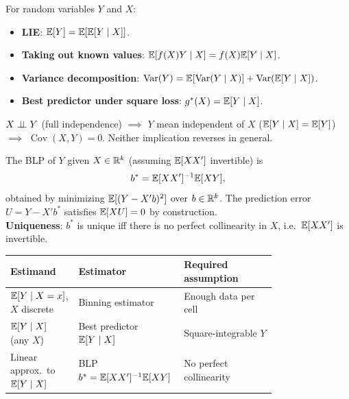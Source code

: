 \begin{remark}
	For random variables $Y$ and $X$:
	\begin{itemize}
		\item \textbf{LIE}: $\mathbb{E}[Y]=\mathbb{E}[\mathbb{E}[Y\mid X]]$.
		\item \textbf{Taking out known values}: $\mathbb{E}[f(X)Y\mid X]=f(X)\mathbb{E}[Y\mid X]$.
		\item \textbf{Variance decomposition}: $\operatorname{Var}(Y)=\mathbb{E}[\operatorname{Var}(Y\mid X)]+\operatorname{Var}(\mathbb{E}[Y\mid X])$.
		\item \textbf{Best predictor under square loss}: $g^*(X)=\mathbb{E}[Y\mid X]$.
	\end{itemize}
\end{remark}

\begin{remark}
	$X\perp\!\!\!\perp Y$ (full independence) $\implies$ $Y$ mean independent of $X$ ($\mathbb{E}[Y\mid X]=\mathbb{E}[Y]$) $\implies$ $\operatorname{Cov}(X,Y)=0$. Neither implication reverses in general.
\end{remark}

\begin{remark}
	The BLP of $Y$ given $X\in\mathbb{R}^k$ (assuming $\mathbb{E}[XX']$ invertible) is
	\[
		b^* = \mathbb{E}[XX']^{-1}\mathbb{E}[XY],
	\]
	obtained by minimizing $\mathbb{E}[(Y-X'b)^2]$ over $b\in\mathbb{R}^k$. The prediction error $U=Y-X'b^*$ satisfies $\mathbb{E}[XU]=0$ by construction. \\[0.4em]
	\textbf{Uniqueness}: $b^*$ is unique iff there is no perfect collinearity in $X$, i.e.\ $\mathbb{E}[XX']$ is invertible.
\end{remark}

\begin{remark}
	\begin{center}
	\small
	\renewcommand{\arraystretch}{1.1}
	\begin{tabular}{p{0.22\linewidth}p{0.22\linewidth}p{0.33\linewidth}}
		\toprule
		Estimand & Estimator & Required assumption \\
		\midrule
		$\mathbb{E}[Y\mid X=x]$, $X$ discrete & Binning estimator & Enough data per cell \\
		$\mathbb{E}[Y\mid X]$ (any $X$) & Best predictor $\mathbb{E}[Y\mid X]$ & Square-integrable $Y$ \\
		Linear approx.\ to $\mathbb{E}[Y\mid X]$ & BLP $b^*=\mathbb{E}[XX']^{-1}\mathbb{E}[XY]$ & No perfect collinearity \\
		\bottomrule
	\end{tabular}
	\end{center}
\end{remark}

\newpage
